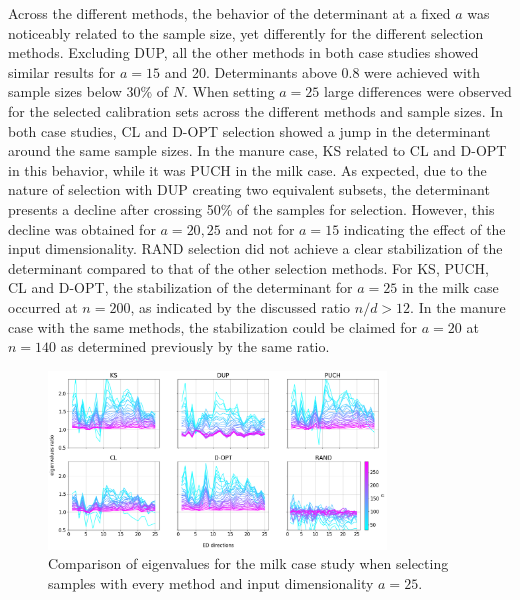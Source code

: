 \documentclass[journal=ancham,manuscript=article]{achemso}
\begin{document}
Across the different methods, the behavior of the determinant at a fixed $a$ was noticeably related to the sample size, yet differently for the different selection methods. Excluding DUP, all the other methods in both case studies showed similar results for $a=15$ and 20. Determinants above 0.8 were achieved with sample sizes below 30\% of $N$. When setting $a=25$ large differences were observed for the selected calibration sets across the different methods and sample sizes. In both case studies, CL and D-OPT selection showed a jump in the determinant around the same sample sizes. In the manure case, KS related to CL and D-OPT in this behavior, while it was PUCH in the milk case. As expected, due to the nature of selection with DUP creating two equivalent subsets, the determinant presents a decline after crossing 50\% of the samples for selection. However, this decline was obtained for $a=20, 25$ and not for $a=15$ indicating the effect of the input dimensionality. RAND selection did not achieve a clear stabilization of the determinant compared to that of the other selection methods. For KS, PUCH, CL and D-OPT, the stabilization of the determinant for $a=25$ in the milk case occurred at $n=200$, as indicated by the discussed ratio $n/d>12$. In the manure case with the same methods, the stabilization could be claimed for $a=20$ at $n=140$ as determined previously by the same ratio. 

\begin{figure}[H]
\includegraphics[width=0.8\textwidth]{manuscript/figures/d01_milk_specific_framework_eigenvalsratio.png}
\centering
\caption{Comparison of eigenvalues for the milk case study when selecting samples with every method and input dimensionality $a=25$.}
\label{fig_d01_milk_specific_framework_eigenvalsratio}
\end{figure}
\end{document}
